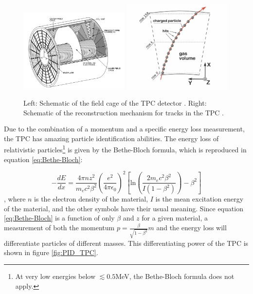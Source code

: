 \begin{figure}
    \centering
    \includegraphics[width=0.49\textwidth]{figures/tpc_cage.png}
    \includegraphics[width=0.49\textwidth]{figures/tpc_process.png}
    \caption{Left: Schematic of the field cage of the TPC detector \cite{}. Right: Schematic of the reconstruction mechanism for tracks in the TPC \cite{ALICE_TPC_trigger}.}
    \label{fig:TPC_schemtic}
\end{figure}

Due to the combination of a momentum and a specific energy loss measurement, the TPC has amazing particle identification abilities. The energy loss of relativistic particles\footnote{At very low energies below $\lesssim 0.5 $MeV, the Bethe-Bloch formula does not apply. } is given by the Bethe-Bloch formula, which is reproduced in equation \ref{eq:Bethe-Bloch}:

\begin{equation}\label{eq:Bethe-Bloch}
    -\frac{dE}{dx} = \frac{4\pi n z^2}{m_e c^2 \beta^2} \left( \frac{e^2}{4\pi \epsilon_0}\right)^2 \left[ \mathrm{ln}\left(\frac{2m_ec^2\beta^2}{I(1-\beta^2)}\right)-\beta^2 \right]
\end{equation}
, where $n$ is the electron density of the material, $I$ is the mean excitation energy of the material, and the other symbols have their usual meaning. Since equation \ref{eq:Bethe-Bloch} is a function of only $\beta$ and $z$ for a given material, a measurement of both the momentum $p=\frac{\beta}{\sqrt{1-\beta^2}}m$ and the energy loss will differentiate particles of different masses. This differentiating power of the TPC is shown in figure \ref{fig:PID_TPC}. 

